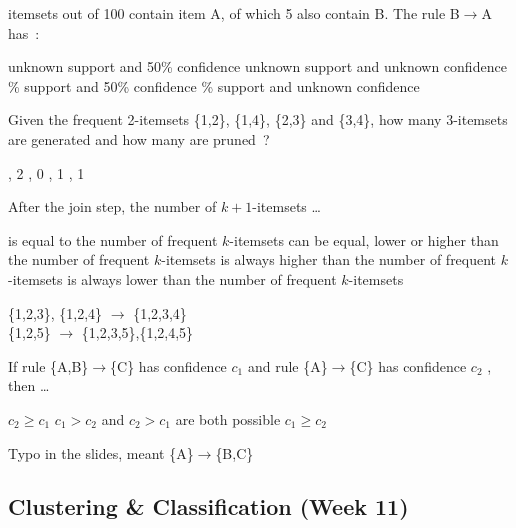 \documentclass[12pt,a4paper,answers]{exam} %
\begin{document}
\begin{flushleft}
\begin{multicols*}{2}
\begin{questions}
 itemsets out of 100 contain item A, of which 5 also contain B. The rule B$\rightarrow$A has~:
\begin{checkboxes}
\choice unknown support and 50\% confidence
\choice unknown support and unknown confidence
\% support and 50\% confidence
\% support and unknown confidence
\end{checkboxes}

\question Given the frequent 2-itemsets \{1,2\}, \{1,4\}, \{2,3\} and \{3,4\}, how many 3-itemsets are generated and how many are pruned~?
\begin{checkboxes}
, 2
, 0
, 1
, 1
\end{checkboxes}

\question After the join step, the number of $k+1$-itemsets \ldots
\begin{checkboxes}
\choice is equal to the number of frequent $k$-itemsets
\CorrectChoice can be equal, lower or higher than the number of frequent $k$-itemsets
\choice is always higher than the number of frequent $k$-itemsets
\choice is always lower than the number of frequent $k$-itemsets
\end{checkboxes}
\begin{solution}
\{1,2,3\}, \{1,2,4\} $\rightarrow$ \{1,2,3,4\}\\
\{1,2,5\} $\rightarrow$ \{1,2,3,5\},\{1,2,4,5\}
\end{solution}

\question If rule \{A,B\}$\rightarrow$\{C\} has confidence $c_1$ and rule \{A\}$\rightarrow$\{C\} has confidence $c_2$ , then \ldots
\begin{checkboxes}
\choice $c_2 \geq c_1$
\CorrectChoice $c_1 > c_2$ and $c_2 > c_1$ are both possible
\choice $c_1 \geq c_2$
\end{checkboxes}
\begin{solution}
Typo in the slides, meant \{A\}$\rightarrow$\{B,C\}
%
%
\end{solution}


\subsection{Clustering \& Classification (Week 11)}

\end{questions}
\end{multicols*}
\end{flushleft}
\end{document}
